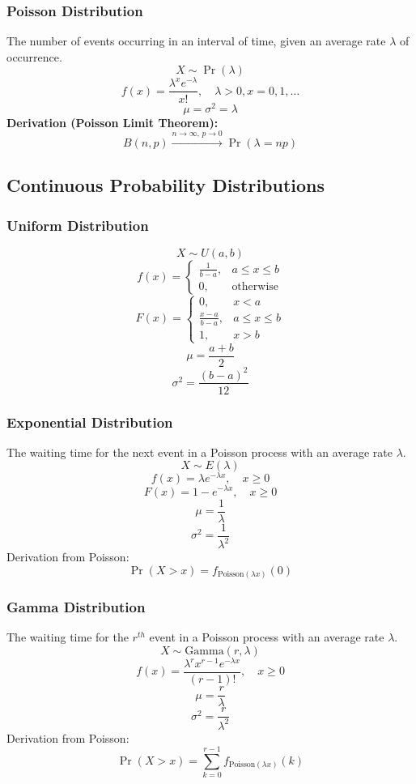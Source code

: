 \documentclass{article}
\begin{document}
\subsubsection{Poisson Distribution}
The number of events occurring in an interval of time, given an average rate \( \lambda \) of occurrence.
\[ X \sim \Pr(\lambda) \]
\[ f(x) = \frac{\lambda^x e^{-\lambda}}{x!}, \quad \lambda>0, x=0,1,\dots \]
\[ \mu = \sigma^2 = \lambda \]
\textbf{Derivation (Poisson Limit Theorem):}
\[
    B(n, p) \xrightarrow{n \to \infty,\, p \to 0} \Pr(\lambda = np)
\]

\subsection{Continuous Probability Distributions}

\subsubsection{Uniform Distribution}
\[
    X \sim U(a, b)
\]
\[
    f(x) =
    \begin{cases}
        \frac{1}{b-a}, & a \leq x \leq b \\
        0, & \text{otherwise}
    \end{cases}
\]
\[
    F(x) =
    \begin{cases}
        0, & x < a \\
        \frac{x-a}{b-a}, & a \leq x \leq b \\
        1, & x > b
    \end{cases}
\]
\[
    \mu = \frac{a+b}{2}
\]
\[
    \sigma^2 = \frac{(b-a)^2}{12}
\]

\subsubsection{Exponential Distribution}
The waiting time for the next event in a Poisson process with an average rate \( \lambda \).
\[ X \sim E(\lambda) \]
\[
    f(x) = \lambda e^{-\lambda x}, \quad x \geq 0
\]
\[
    F(x) = 1 - e^{-\lambda x}, \quad x \geq 0
\]
\[
    \mu = \frac{1}{\lambda}
\]
\[
    \sigma^2 = \frac{1}{\lambda^2}
\]
Derivation from Poisson:
\[
    \Pr(X>x) = f_{\text{Poisson}(\lambda x)}(0)
\]

\subsubsection{Gamma Distribution}
The waiting time for the \( r^{th} \) event in a Poisson process with an average rate \( \lambda \).
\[ X \sim \mathrm{Gamma}(r, \lambda) \]
\[
    f(x) = \frac{\lambda^r x^{r-1} e^{-\lambda x}}{(r-1)!}, \quad x \geq 0
\]
\[
    \mu = \frac{r}{\lambda}
\]
\[
    \sigma^2 = \frac{r}{\lambda^2}
\]
Derivation from Poisson:
\[
    \Pr(X > x) = \sum_{k=0}^{r-1} f_{\text{Poisson}(\lambda x)}(k)
\]
\end{document}
